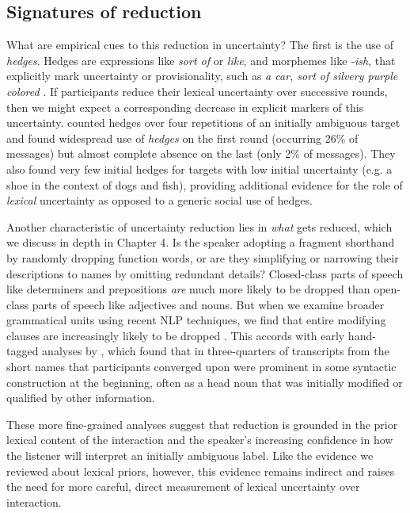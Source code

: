 \subsection{Signatures of reduction}

What are empirical cues to this reduction in uncertainty? The first is the use of \emph{hedges}. Hedges are expressions like \emph{sort of} or \emph{like}, and morphemes like \emph{-ish}, that explicitly mark uncertainty or provisionality, such as \emph{a car, sort of silvery purple colored} \cite{BrennanClark96_ConceptualPactsConversation,Fraser10_Hedging,MedlockBriscoe07_HedgeClassification}. If participants reduce their lexical uncertainty over successive rounds, then we might expect a corresponding decrease in explicit markers of this uncertainty.  counted hedges over four repetitions of an initially ambiguous target and found widespread use of \emph{hedges} on the first round (occurring 26\% of messages) but almost complete absence on the last (only 2\% of messages). They also found very few initial hedges for targets with low initial uncertainty (e.g. a shoe in the context of dogs and fish), providing additional evidence for the role of \emph{lexical} uncertainty as opposed to a generic social use of hedges.

Another characteristic of uncertainty reduction lies in \emph{what} gets reduced, which we discuss in depth in Chapter 4. 
Is the speaker adopting a fragment shorthand by randomly dropping function words, or are they simplifying or narrowing their descriptions to names by omitting redundant details? Closed-class parts of speech like determiners and prepositions \emph{are} much more likely to be dropped than open-class parts of speech like adjectives and nouns. But when we examine broader grammatical units using recent NLP techniques, we find that entire modifying clauses are increasingly likely to be dropped \cite{HawkinsFrankGoodman17_ConventionFormation}. This accords with early hand-tagged analyses by , which found that in three-quarters of transcripts from  the short names that participants converged upon were prominent in some syntactic construction at the beginning, often as a head noun that was initially modified or qualified by other information. 


These more fine-grained analyses suggest that reduction is grounded in the prior lexical content of the interaction and the speaker's increasing confidence in how the listener will interpret an initially ambiguous label. Like the evidence we reviewed about lexical priors, however, this evidence remains indirect and raises the need for more careful, direct measurement of lexical uncertainty over interaction. 

